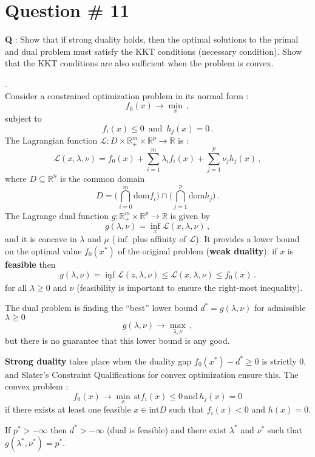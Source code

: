 \documentclass[a4paper]{article}
\newcommand{\Real}{\mathbb{R}}
\newcommand{\Lcal}{\mathcal{L}}
\begin{document}
\clearpage

\section[Convex optimization]{Question \# 11} %
\label{sec:question_11}
\textbf{\large \textbf{Q}} : Show that if strong duality holds, then the optimal
solutions to the primal and dual problem must satisfy the KKT conditions (necessary
condition). Show that the KKT conditions are also sufficient when the problem is
convex.

 .\hfill\\
Consider a constrained optimization problem in its normal form :
\[ f_0(x) \to \min_x \,, \]
subject to
\[ f_i(x) \leq 0\,\text{ and }\, h_j(x) = 0 \,. \]
The Lagrangian function $\Lcal: D \times \Real_+^m \times \Real^p \to \Real$ is :
\[
\Lcal(x, \lambda, \nu) = f_0(x) + \sum_{i=1}^m \lambda_i f_i(x) + \sum_{j=1}^p \nu_j h_j(x) \,,
\]
where $D \subseteq \Real^n$ is the common domain
\[
D = \bigl( \bigcap_{i=0}^m \text{dom} f_i \bigr) \cap \bigl( \bigcap_{j=1}^p \text{dom} h_j \bigr) \,.
\]
The Lagrange dual function $g : \Real_+^m \times \Real^p \to \Real$ is given by
\[
g(\lambda,\nu) = \inf_x \Lcal(x,\lambda,\nu)\,,
\]
and it is concave in $\lambda$ and $\mu$ ($\inf$ plus affinity of $\Lcal$). It provides
a lower bound on the optimal value $f_0(x^*)$ of the original problem (\textbf{weak duality}):
if $x$ is \textbf{feasible} then
\[ 
g(\lambda,\nu) = \inf_z \Lcal(z,\lambda,\nu)\leq \Lcal(x, \lambda,\nu) \leq f_0(x) \,.
\]
for all $\lambda\geq0$ and $\nu$ (feasibility is important to ensure the right-most
inequality).

The dual problem is finding the ``best'' lower bound $d^* = g(\lambda,\nu)$ for
admissible $\lambda\geq 0$
\[
g(\lambda,\nu) \to \max_{\lambda,\nu}\,,
\]
but there is no guarantee that this lower bound is any good.

\textbf{Strong duality} takes place when the duality gap $f_0(x^*) - d^*\geq 0$ is
strictly $0$, and Slater's Constraint Qualifications for convex optimization ensure
this. The convex problem :
\[ f_0(x) \to \min_x\,\text{st} f_i(x) \leq 0\,\text{and}\, h_j(x) = 0\]
if there exists at least one feasible $x\in \text{int} D$ such that $f_i(x) < 0$ and $h(x) = 0$.

If $p^*>-\infty$ then $d^*>-\infty$ (dual is feasible) and there exist $\lambda^*$
and $\nu^*$ such that $g(\lambda^*, \nu^*) = p^*$.
\end{document}
